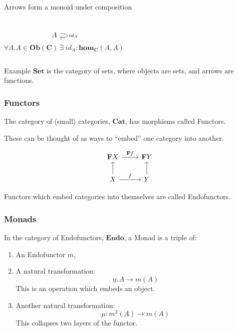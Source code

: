 \documentclass[usenames,dvipsnames]{beamer}
\begin{document}
\begin{frame}[fragile]
\begin{block}{Arrows form a monoid under composition}
\begin{columns}
\begin{equation*}
        \begin{tikzcd}
          A \arrow[loop right, "id_A"]
        \end{tikzcd}
      \end{equation*}
      \begin{equation}
        \forall A. A \in \mathbf{Ob}(\mathbf{C}) \: \exists \; \mathit{id}_A : \mathbf{hom}_{\mathbf{C}}(A, A)
      \end{equation}
    \end{columns}
  \end{block}
  \pause
  \begin{block}{Example}
    $\mathbf{Set}$ is the category of sets, where objects are sets, and arrows
    are functions.
  \end{block}
\end{frame}
\begin{frame}[fragile]
  \frametitle{Functors}
  The category of (small) categories, $\mathbf{Cat}$, has morphisms called
  Functors.
  \pause

  These can be thought of as ways to ``embed'' one category into another.
  \pause

  \begin{equation*}
    \begin{tikzcd}
      \mathbf{F}X \ar[r, "\mathbf{F}f"] & \mathbf{F}Y \\
      X \ar[r, "f"] \ar[u]              & Y \ar[u]
    \end{tikzcd}
  \end{equation*}
  
  Functors which embed categories into themselves are called Endofunctors.
\end{frame}
\begin{frame}
  \frametitle{Monads}
  In the category of Endofunctors, $\mathbf{Endo}$, a Monad is a triple of:
  \begin{enumerate}
    \item An Endofunctor $\mathit{m}$,
    \item A natural transformation:
      \begin{equation}
        \eta : A \rightarrow \mathit{m}(A)
      \end{equation}
      This is an operation which embeds an object.
    \item Another natural transformation:
      \begin{equation}
        \mu : \mathit{m}^2(A) \rightarrow \mathit{m}(A)
      \end{equation}
      This collapses two layers of the functor.
  \end{enumerate}
\end{frame}
\end{document}
